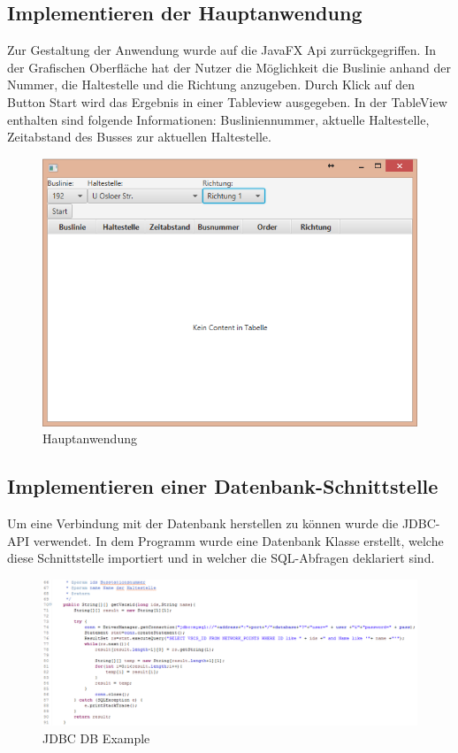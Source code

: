 \documentclass[a4paper, 12.5pt]{scrartcl}
\begin{document}
\subsection{Implementieren der Hauptanwendung}
Zur Gestaltung der Anwendung wurde auf die JavaFX Api zurrückgegriffen. 
In der Grafischen Oberfläche hat der Nutzer die Möglichkeit die Buslinie anhand der Nummer, 
die Haltestelle und die Richtung anzugeben. Durch Klick auf den Button Start wird das Ergebnis in einer Tableview ausgegeben. In der TableView enthalten sind folgende Informationen:
Busliniennummer, aktuelle Haltestelle, Zeitabstand des Busses zur aktuellen Haltestelle.\\

\begin{figure}[h]
	\centering
	\includegraphics[scale=0.6]{Hauptanwendung.png}
	\caption{Hauptanwendung}
	\label{img:Hauptanwendung}
\end{figure}
\newpage

\subsection{Implementieren einer Datenbank-Schnittstelle}
Um eine Verbindung mit der Datenbank herstellen zu können wurde die JDBC-API verwendet. In dem Programm wurde eine Datenbank Klasse erstellt, welche diese Schnittstelle importiert und in welcher die SQL-Abfragen deklariert sind.\\

\begin{figure}[h]
	\centering
	\includegraphics[scale=0.55]{jdbc-database-example.png}
	\caption{JDBC DB Example}
	\label{img:JDBC}
\end{figure}
\end{document}
